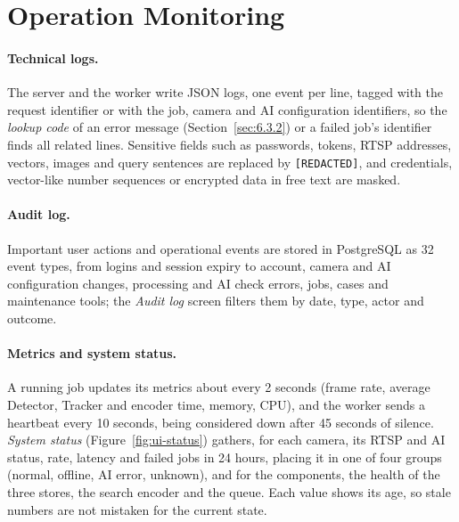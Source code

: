 \section{Operation Monitoring}
\label{sec:6.4}

\paragraph{Technical logs.} The server and the worker write JSON logs, one event per line, tagged with the request identifier or with the job, camera and AI configuration identifiers, so the \emph{lookup code} of an error message (Section~\ref{sec:6.3.2}) or a failed job's identifier finds all related lines. Sensitive fields such as passwords, tokens, RTSP addresses, vectors, images and query sentences are replaced by \texttt{[REDACTED]}, and credentials, vector-like number sequences or encrypted data in free text are masked.

\paragraph{Audit log.} Important user actions and operational events are stored in PostgreSQL as 32 event types, from logins and session expiry to account, camera and AI configuration changes, processing and AI check errors, jobs, cases and maintenance tools; the \emph{Audit log} screen filters them by date, type, actor and outcome.

\paragraph{Metrics and system status.} A running job updates its metrics about every 2 seconds (frame rate, average Detector, Tracker and encoder time, memory, CPU), and the worker sends a heartbeat every 10 seconds, being considered down after 45 seconds of silence. \emph{System status} (Figure~\ref{fig:ui-status}) gathers, for each camera, its RTSP and AI status, rate, latency and failed jobs in 24 hours, placing it in one of four groups (normal, offline, AI error, unknown), and for the components, the health of the three stores, the search encoder and the queue. Each value shows its age, so stale numbers are not mistaken for the current state.
